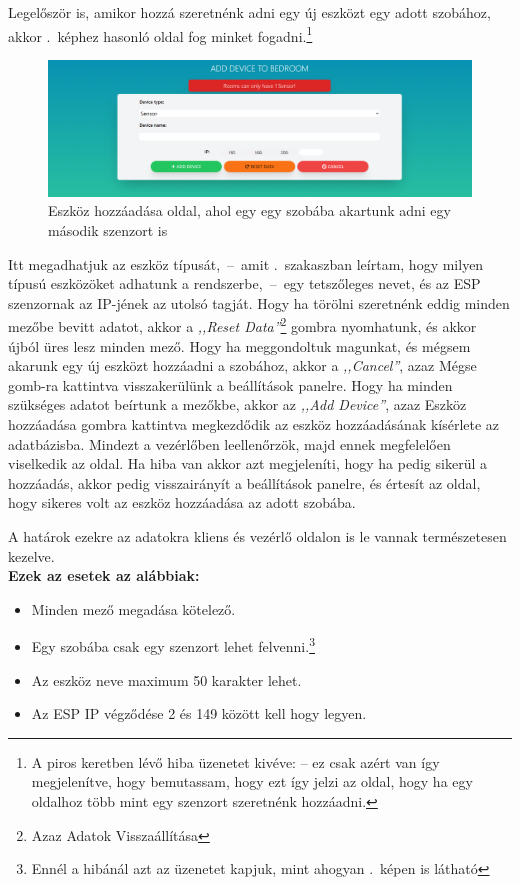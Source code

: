 \documentclass[
]{thesis-ekf}
\theoremstyle{definition}
\theoremstyle{remark}
\begin{document}
	Legelőször is, amikor hozzá szeretnénk adni egy új eszközt egy adott szobához, akkor .~képhez hasonló oldal fog minket fogadni.\footnote{A piros keretben lévő hiba üzenetet kivéve: -- ez csak azért van így megjelenítve, hogy bemutassam, hogy ezt így jelzi az oldal, hogy ha egy oldalhoz több mint egy szenzort szeretnénk hozzáadni.}
	
	\begin{figure}[ht!]
		\centering
		\includegraphics[width=1\textwidth]{./src/pages_img/sensor-error}
		\caption{Eszköz hozzáadása oldal, ahol egy egy szobába akartunk adni egy második szenzort is}
		\label{add-sensor-error}
	\end{figure}
	
	Itt megadhatjuk az eszköz típusát,~--~amit .~szakaszban leírtam, hogy milyen típusú eszközöket adhatunk a rendszerbe,~--~egy tetszőleges nevet, és az ESP szenzornak az IP-jének az utolsó tagját. Hogy ha törölni szeretnénk eddig minden mezőbe bevitt adatot, akkor a \emph{,,Reset Data''}\footnote{Azaz Adatok Visszaállítása} gombra nyomhatunk, és akkor újból üres lesz minden mező. Hogy ha meggondoltuk magunkat, és mégsem akarunk egy új eszközt hozzáadni a szobához, akkor a \emph{,,Cancel''}, azaz Mégse gomb-ra kattintva visszakerülünk a beállítások panelre. Hogy ha minden szükséges adatot beírtunk a mezőkbe, akkor az \emph{,,Add Device''}, azaz Eszköz hozzáadása gombra kattintva megkezdődik az eszköz hozzáadásának kísérlete az adatbázisba. Mindezt a vezérlőben leellenőrzök, majd ennek megfelelően viselkedik az oldal. Ha hiba van akkor azt megjeleníti, hogy ha pedig sikerül a hozzáadás, akkor pedig visszairányít a beállítások panelre, és értesít az oldal, hogy sikeres volt az eszköz hozzáadása az adott szobába.
	
	 A határok ezekre az adatokra kliens és vezérlő oldalon is le vannak természetesen kezelve.\\
	\textbf{Ezek az esetek az alábbiak:} 
	\begin{itemize}
		\item Minden mező megadása kötelező.
		\item Egy szobába csak egy szenzort lehet felvenni.\footnote{Ennél a hibánál azt az üzenetet kapjuk, mint ahogyan .~képen is látható}
		\item Az eszköz neve maximum 50 karakter lehet.
		\item Az ESP IP végződése 2 és 149 között kell hogy legyen.
	\end{itemize}
		
\end{document}

